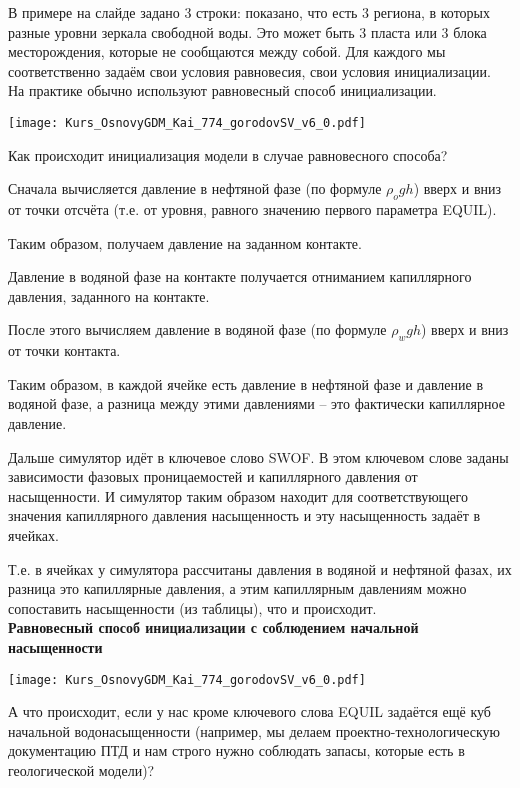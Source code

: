 В примере на слайде задано 3 строки: показано, что есть 3 региона, в которых разные уровни зеркала свободной воды.
Это может быть 3 пласта или 3 блока месторождения, которые не сообщаются между собой.
Для каждого мы соответственно задаём свои условия равновесия, свои условия инициализации.
\\

На практике обычно используют равновесный способ инициализации.

\texttt{[image: Kurs\_OsnovyGDM\_Kai\_774\_gorodovSV\_v6\_0.pdf]}

Как происходит инициализация модели в случае равновесного способа?

Сначала вычисляется давление в нефтяной фазе (по формуле $\rho_o gh$) вверх и вниз от точки отсчёта (т.е. от уровня, равного значению первого параметра EQUIL).

Таким образом, получаем давление на заданном контакте.

Давление в водяной фазе на контакте получается отниманием капиллярного давления, заданного на контакте.

После этого вычисляем давление в водяной фазе (по формуле $\rho_w gh$) вверх и вниз от точки контакта.

Таким образом, в каждой ячейке есть давление в нефтяной фазе и давление в водяной фазе, а разница между этими давлениями -- это фактически капиллярное давление.

Дальше симулятор идёт в ключевое слово SWOF.
В этом ключевом слове заданы зависимости фазовых проницаемостей и капиллярного давления от насыщенности.
И симулятор таким образом находит для соответствующего значения капиллярного давления насыщенность и эту насыщенность задаёт в ячейках.

Т.е. в ячейках у симулятора рассчитаны давления в водяной и нефтяной фазах, их разница это капиллярные давления, а этим капиллярным давлениям можно сопоставить насыщенности (из таблицы), что и происходит.
\\

\textbf{Равновесный способ инициализации с соблюдением начальной насыщенности}

\texttt{[image: Kurs\_OsnovyGDM\_Kai\_774\_gorodovSV\_v6\_0.pdf]}

А что происходит, если у нас кроме ключевого слова EQUIL задаётся ещё куб начальной водонасыщенности (например, мы делаем проектно-технологическую документацию ПТД и нам строго нужно соблюдать запасы, которые есть в геологической модели)?
\\

